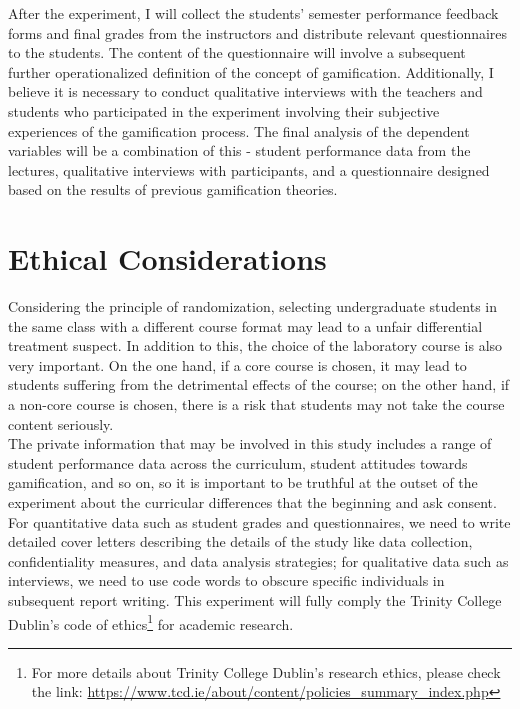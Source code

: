 \documentclass[12pt]{article} %
\begin{document}
\noindent After the experiment, I will collect the students' semester performance feedback forms and final grades from the instructors and distribute relevant questionnaires to the students. The content of the questionnaire will involve a subsequent further operationalized definition of the concept of gamification. Additionally, I believe it is necessary to conduct qualitative interviews with the teachers and students who participated in the experiment involving their subjective experiences of the gamification process. The final analysis of the dependent variables will be a combination of this - student performance data from the lectures, qualitative interviews with participants, and a questionnaire designed based on the results of previous gamification theories.\\

\section*{Ethical Considerations}
\noindent Considering the principle of randomization, selecting undergraduate students in the same class with a different course format may lead to a unfair differential treatment suspect. In addition to this, the choice of the laboratory course is also very important. On the one hand, if a core course is chosen, it may lead to students suffering from the detrimental effects of the course; on the other hand, if a non-core course is chosen, there is a risk that students may not take the course content seriously.\\

\noindent The private information that may be involved in this study includes a range of student performance data across the curriculum, student attitudes towards gamification, and so on, so it is important to be truthful at the outset of the experiment about the curricular differences that the beginning and ask consent. For quantitative data such as student grades and questionnaires, we need to write detailed cover letters describing the details of the study like data collection, confidentiality measures, and data analysis strategies; for qualitative data such as interviews, we need to use code words to obscure specific individuals in subsequent report writing. This experiment will fully comply the Trinity College Dublin's code of ethics\footnote{For more details about Trinity College Dublin's research ethics, please check the link:  \url{https://www.tcd.ie/about/content/policies_summary_index.php}} for academic research.\\
\newpage


\end{document}
